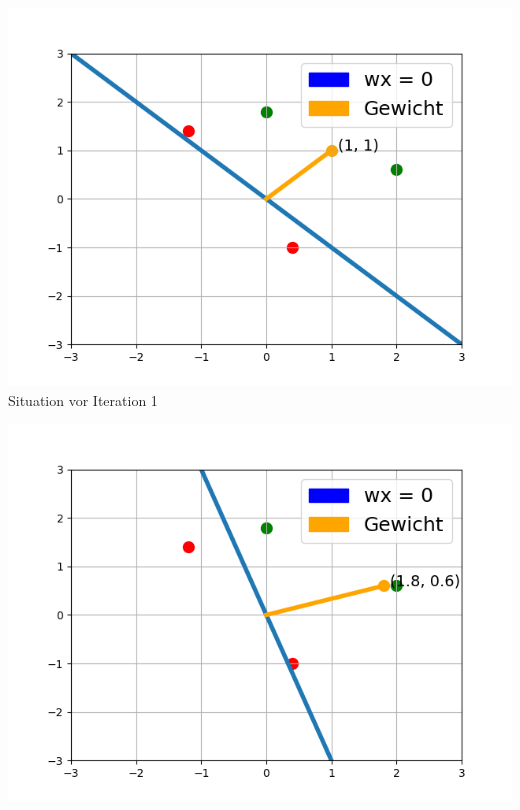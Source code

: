 \documentclass[fontsize=11pt]{scrartcl}
\newenvironment{Figure}
  {\par\medskip\noindent\minipage{\linewidth}}
  {\endminipage\par\medskip}
\begin{document}
                        \begin{Figure}
                            \begin{minipage}[b]{.4\linewidth}
                                \includegraphics[scale=0.5]{bsp1.png}
                                {Situation vor Iteration 1} \label{fig:bspPL1}   
                            \end{minipage}
                            \hspace{.1\linewidth}
                            \begin{minipage}[b]{.4\linewidth}
                                \includegraphics[scale=0.5]{bsp2.png}
                                \label{fig:bspPL2}    
                            \end{minipage}
                        \end{Figure}
\end{document}
